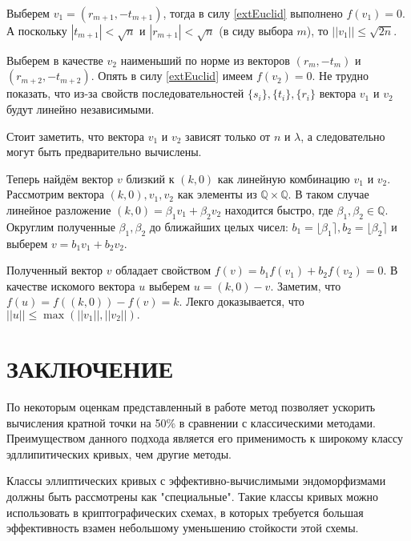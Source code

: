 \documentclass[a4paper,12pt]{article}
\theoremstyle{definition}
\theoremstyle{underline}
\begin{document}
	Выберем $v_1=(r_{m+1}, -t_{m+1})$, тогда в силу \eqref{extEuclid} выполнено $f(v_1)=0$. А поскольку $|t_{m+1}| < \sqrt{n}$ и $|r_{m+1}| < \sqrt{n}$ (в сиду выбора $m$), то $||v_1|| \leqslant \sqrt{2n}$.
	
	Выберем в качестве $v_2$ наименьший по норме из векторов $(r_m, -t_m)$ и $(r_{m+2}, -t_{m+2})$. Опять в силу \eqref{extEuclid} имеем $f(v_2)=0$. Не трудно показать, что из-за свойств последовательностей $\{s_i\}, \{t_i\}, \{r_i\}$ вектора $v_1$ и $v_2$ будут линейно независимыми.
	
	Стоит заметить, что вектора $v_1$ и $v_2$ зависят только от $n$ и $\lambda$, а следовательно могут быть предварительно вычислены.
	
	Теперь найдём вектор $v$ близкий к $(k, 0)$ как линейную комбинацию $v_1$ и $v_2$. Рассмотрим вектора $(k, 0), v_1, v_2$ как элементы из $\mathbb{Q} \times \mathbb{Q}$. В таком случае линейное разложение $(k,0)= \beta_1 v_1 + \beta_2 v_2$ находится быстро, где $\beta_1, \beta_2 \in \mathbb{Q}$. Округлим полученные $\beta_1, \beta_2$ до ближайших целых чисел: $b_1 = \lfloor \beta_1 \rceil, b_2 = \lfloor \beta_2 \rceil$ и выберем $v = b_1 v_1 + b_2 v_2$. 
	
	Полученный вектор $v$ обладает свойством $f(v)=b_1 f(v_1) + b_2 f(v_2) = 0$. В качестве искомого вектора $u$ выберем $u=(k, 0) - v$. Заметим, что $f(u) = f\left((k,0)\right) - f(v) = k$. Лекго доказывается, что $||u|| \leqslant \max(||v_1||, ||v_2||).$

	\newpage
	\section*{ЗАКЛЮЧЕНИЕ}
	
	По некоторым оценкам представленный в работе метод позволяет ускорить вычисления кратной точки на 50\% в сравнении с классическими методами. Преимуществом данного подхода является его применимость к широкому классу эдллипитических кривых, чем другие методы.
	
	Классы эллиптических кривых с эффективно-вычислимыми эндоморфизмами должны быть рассмотрены как "специальные". Такие классы кривых можно использовать в криптографических схемах, в которых требуется большая эффективность взамен небольшому уменьшению стойкости этой схемы.
	
	\newpage
	\printbibliography[title={БИБЛИОГРАФИЧЕСКИЙ СПИСОК}]
		
	
\end{document}
